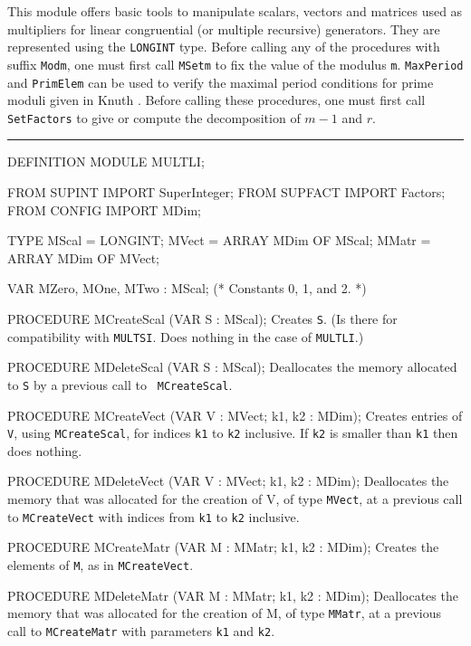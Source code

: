
This module offers basic tools to manipulate scalars, vectors and matrices
used as multipliers for linear congruential (or multiple recursive) generators.
They are represented using the {\tt LONGINT} type.
Before calling any of the procedures with suffix {\tt Modm}, one must first
call {\tt MSetm} to fix the value of the modulus {\tt m}.
{\tt MaxPeriod} and {\tt PrimElem} can be used to verify the maximal period
conditions for prime moduli given in Knuth \cite{rKNU81a}.
Before calling these procedures, one must first call {\tt SetFactors}
to give or compute the decomposition of $m-1$ and $r$.

\bigskip\hrule
\code

DEFINITION MODULE MULTLI;

FROM SUPINT  IMPORT SuperInteger;
FROM SUPFACT IMPORT Factors;
FROM CONFIG  IMPORT MDim;

TYPE
   MScal   = LONGINT;
   MVect   = ARRAY MDim OF MScal;
   MMatr   = ARRAY MDim OF MVect;

VAR
   MZero, MOne, MTwo : MScal;            (* Constants 0, 1, and 2.       *)

PROCEDURE MCreateScal (VAR S : MScal);
\endcode
  \tab  Creates {\tt S}. (Is there for compatibility with {\tt MULTSI}.
  Does nothing in the case of {\tt MULTLI}.) \endtab
\code

PROCEDURE MDeleteScal (VAR S : MScal);
\endcode
  \tab Deallocates the memory allocated to {\tt S} by a previous call to {\tt
  MCreateScal}.\endtab
\code

PROCEDURE MCreateVect (VAR V : MVect; k1, k2 : MDim);
\endcode
  \tab  Creates entries of {\tt V}, using {\tt MCreateScal},
  for indices {\tt k1}  to  {\tt k2} inclusive.
  If  {\tt k2} is smaller than  {\tt k1}  then does nothing.\endtab
\code

PROCEDURE MDeleteVect (VAR V : MVect; k1, k2 : MDim);
\endcode
  \tab  Deallocates the memory  that was allocated for the creation of V,
  of type {\tt MVect}, at a previous call to {\tt MCreateVect} with indices 
  from {\tt k1}  to  {\tt k2} inclusive.
  \endtab
\code

PROCEDURE MCreateMatr (VAR M : MMatr; k1, k2 : MDim);
\endcode
  \tab  Creates the elements of {\tt M}, as in {\tt MCreateVect}.\endtab
\code

PROCEDURE MDeleteMatr (VAR M : MMatr; k1, k2 : MDim);
\endcode
  \tab Deallocates the memory  that was allocated for the creation of M,
  of type {\tt MMatr}, at a previous call to {\tt MCreateMatr} with parameters 
  {\tt k1} and {\tt k2}.
  \endtab
\code

